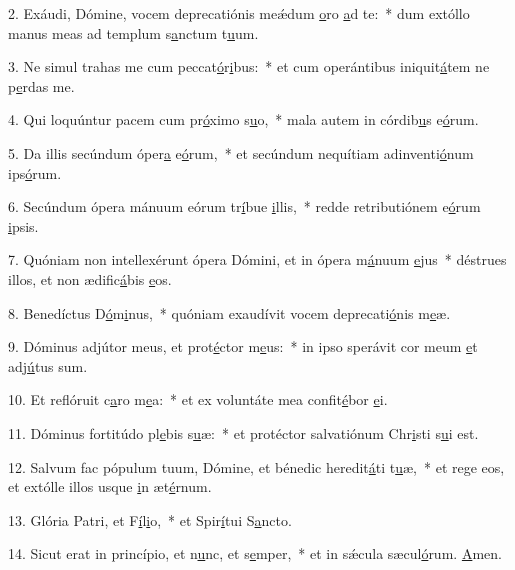 2. Exáudi, Dómine, vocem deprecatiónis meǽdum \uline{o}ro \uline{a}d te:~* dum extóllo manus meas ad templum s\uline{a}nctum t\uline{u}um.\par 
3. Ne simul trahas me cum peccat\uline{ó}r\uline{i}bus:~* et cum operántibus iniquit\uline{á}tem ne p\uline{e}rdas me.\par 
4. Qui loquúntur pacem cum pr\uline{ó}ximo s\uline{u}o,~* mala autem in córdib\uline{u}s e\uline{ó}rum.\par 
5. Da illis secúndum óper\uline{a} e\uline{ó}rum,~* et secúndum nequítiam adinventi\uline{ó}num ips\uline{ó}rum.\par 
6. Secúndum ópera mánuum eórum tr\uline{í}bue \uline{i}llis,~* redde retributiónem e\uline{ó}rum \uline{i}psis.\par 
7. Quóniam non intellexérunt ópera Dómini, et in ópera m\uline{á}nuum \uline{e}jus~* déstrues illos, et non ædific\uline{á}bis \uline{e}os.\par 
8. Benedíctus D\uline{ó}m\uline{i}nus,~* quóniam exaudívit vocem deprecati\uline{ó}nis m\uline{e}æ.\par 
9. Dóminus adjútor meus, et prot\uline{é}ctor m\uline{e}us:~* in ipso sperávit cor meum \uline{e}t adj\uline{ú}tus sum.\par 
10. Et reflóruit c\uline{a}ro m\uline{e}a:~* et ex voluntáte mea confit\uline{é}bor \uline{e}i.\par 
11. Dóminus fortitúdo pl\uline{e}bis s\uline{u}æ:~* et protéctor salvatiónum Chr\uline{i}sti s\uline{u}i est.\par 
12. Salvum fac pópulum tuum, Dómine, et bénedic heredit\uline{á}ti t\uline{u}æ,~* et rege eos, et extólle illos usque \uline{i}n æt\uline{é}rnum.\par 
13. Glória Patri, et F\uline{í}l\uline{i}o,~* et Spir\uline{í}tui S\uline{a}ncto.\par 
14. Sicut erat in princípio, et n\uline{u}nc, et s\uline{e}mper,~* et in sǽcula sæcul\uline{ó}rum. \uline{A}men.\par 
